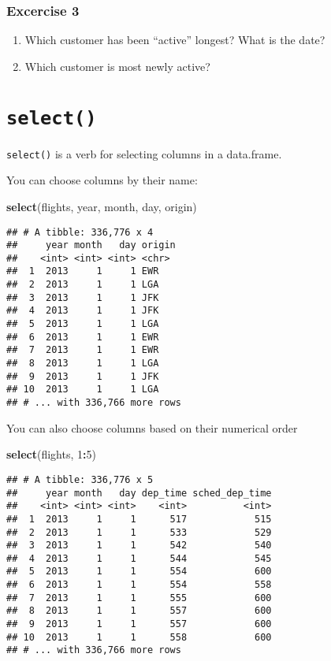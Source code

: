 \documentclass[]{book}
\newenvironment{Shaded}{\begin{snugshade}}{\end{snugshade}}
\newcommand{\DecValTok}[1]{\textcolor[rgb]{0.00,0.00,0.81}{#1}}
\newcommand{\KeywordTok}[1]{\textcolor[rgb]{0.13,0.29,0.53}{\textbf{#1}}}
\newcommand{\NormalTok}[1]{#1}
\newcommand{\OperatorTok}[1]{\textcolor[rgb]{0.81,0.36,0.00}{\textbf{#1}}}
\providecommand{\tightlist}{%
  \setlength{\itemsep}{0pt}\setlength{\parskip}{0pt}}
\begin{document}
\hypertarget{excercise-3}{%
\subsubsection{Excercise 3}\label{excercise-3}}

\begin{enumerate}
\def\labelenumi{\arabic{enumi}.}
\tightlist
\item
  Which customer has been ``active'' longest? What is the date?
\item
  Which customer is most newly active?
\end{enumerate}

\hypertarget{select}{%
\section{\texorpdfstring{\texttt{select()}}{select()}}\label{select}}

\texttt{select()} is a verb for selecting columns in a data.frame.

You can choose columns by their name:

\begin{Shaded}
\begin{Highlighting}[]
\KeywordTok{select}\NormalTok{(flights, year, month, day, origin)}
\end{Highlighting}
\end{Shaded}

\begin{verbatim}
## # A tibble: 336,776 x 4
##     year month   day origin
##    <int> <int> <int> <chr> 
##  1  2013     1     1 EWR   
##  2  2013     1     1 LGA   
##  3  2013     1     1 JFK   
##  4  2013     1     1 JFK   
##  5  2013     1     1 LGA   
##  6  2013     1     1 EWR   
##  7  2013     1     1 EWR   
##  8  2013     1     1 LGA   
##  9  2013     1     1 JFK   
## 10  2013     1     1 LGA   
## # ... with 336,766 more rows
\end{verbatim}

You can also choose columns based on their numerical order

\begin{Shaded}
\begin{Highlighting}[]
\KeywordTok{select}\NormalTok{(flights, }\DecValTok{1}\OperatorTok{:}\DecValTok{5}\NormalTok{)}
\end{Highlighting}
\end{Shaded}

\begin{verbatim}
## # A tibble: 336,776 x 5
##     year month   day dep_time sched_dep_time
##    <int> <int> <int>    <int>          <int>
##  1  2013     1     1      517            515
##  2  2013     1     1      533            529
##  3  2013     1     1      542            540
##  4  2013     1     1      544            545
##  5  2013     1     1      554            600
##  6  2013     1     1      554            558
##  7  2013     1     1      555            600
##  8  2013     1     1      557            600
##  9  2013     1     1      557            600
## 10  2013     1     1      558            600
## # ... with 336,766 more rows
\end{verbatim}
\end{document}
